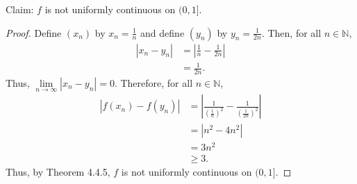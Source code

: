 \documentclass[12pt]{article}
\begin{document}
\newpage
{} Claim: $f$ is not uniformly continuous on $(0,1]$.
\begin{proof}
    Define $(x_n)$ by $x_n = \frac1n$ and define $(y_n)$ by $y_n = \frac1{2n}$. Then, for all $n \in \mathbb N$,
    \begin{align*}
        |x_n - y_n| &= \left| \frac1n - \frac1{2n} \right| \\
                    &= \frac1{2n}.
    \end{align*} Thus, $\lim\limits_{n \to \infty} |x_n - y_n| = 0$.
    Therefore, for all $n \in \mathbb N$, 
    \begin{align*}
        |f(x_n) - f(y_n)| &= \left| \frac1{\left(\frac1{n}\right)^2} - \frac1{\left(\frac1{2n}\right)^2} \right| \\
                          &= |n^2 - 4n^2| \\
                          &= 3n^2 \\
                          &\geq 3.
    \end{align*} Thus, by Theorem 4.4.5, $f$ is not uniformly continuous on $(0, 1]$.
\end{proof}
\end{document}
